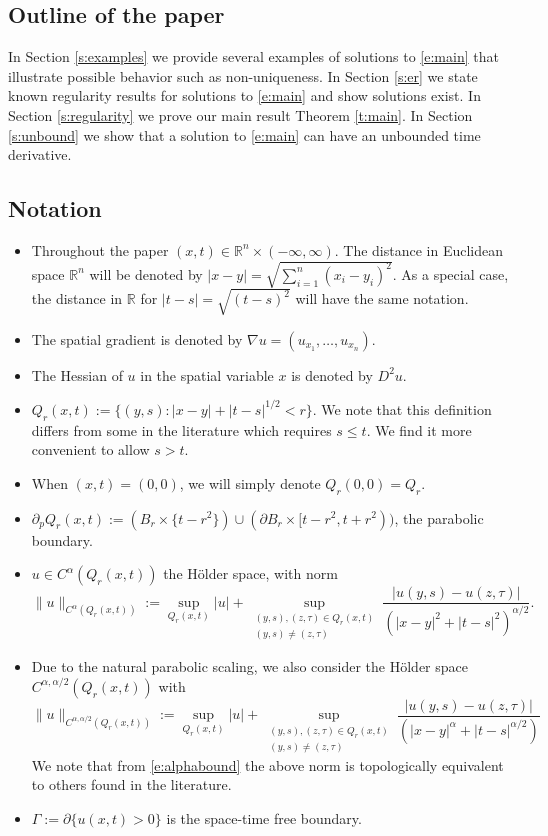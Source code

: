 \documentclass{amsart}
\numberwithin{equation}{section}
\begin{document}
 \subsection{Outline of the paper}
  In Section \ref{s:examples} we provide several examples of solutions to \eqref{e:main} that illustrate possible behavior such as non-uniqueness. In Section \ref{s:er} we state known regularity results for solutions to \eqref{e:main} and show solutions exist. In Section \ref{s:regularity} we prove our main result Theorem \ref{t:main}. In Section \ref{s:unbound} we show that a solution to \eqref{e:main} can have an unbounded time derivative. 
   
 \subsection{Notation}
  \begin{itemize}
      \item Throughout the paper $(x,t) \in \mathbb{R}^n \times (-\infty,\infty)$. The distance in Euclidean space $\mathbb{R}^n$ will be denoted by $|x-y|=\sqrt{\sum_{i=1}^n (x_i-y_i)^2}$. As a special case, the distance in $\mathbb{R}$ for $|t-s|=\sqrt{(t-s)^2}$ will have the same notation. 
      \item The spatial gradient is denoted by $\nabla u = (u_{x_1}, \ldots, u_{x_n})$. 
      \item The Hessian of $u$ in the spatial variable $x$ is denoted by $D^2 u$. 
      \item $Q_r(x,t):=\{(y,s): |x-y|+|t-s|^{1/2} < r\}$. We note that this definition differs from some in the literature which requires $s\leq t$. We find it more convenient to allow $s>t$.  
      \item When $(x,t)=(0,0)$, we will simply denote $Q_r(0,0)=Q_r$. 
      \item $\partial_{p} Q_r(x,t):= (B_r \times \{t-r^2\})\cup(\partial B_r \times [t-r^2,t+r^2))$, the parabolic boundary. 
      \item $u \in C^{\alpha}(Q_r(x,t))$ the H\"older space, with norm 
      \[
       \| u \|_{C^{\alpha}(Q_r(x,t))}:=\sup_{Q_r(x,t)} |u| + \sup_{\substack{(y,s),(z,\tau) \in Q_r(x,t)\\(y,s) \neq (z,\tau) }} \frac{|u(y,s)-u(z,\tau)|}{(|x-y|^2 + |t-s|^2)^{\alpha/2}}. 
      \]
      \item Due to the natural parabolic scaling, we also consider the H\"older space $C^{\alpha,\alpha/2}(Q_r(x,t))$ with 
      \[
      \| u \|_{C^{\alpha,\alpha/2}(Q_r(x,t))}:= \sup_{Q_r(x,t)} |u| + \sup_{\substack{(y,s),(z,\tau) \in Q_r(x,t) \\ (y,s) \neq (z,\tau)}} \frac{|u(y,s)-u(z,\tau)|}{(|x-y|^\alpha + |t-s|^{\alpha/2})}
      \]
      We note that from \eqref{e:alphabound} the above norm is topologically equivalent to others found in the literature. 
      \item $\Gamma := \partial \{u(x,t)>0\}$ is the space-time free boundary. 
  \end{itemize}
\end{document}
